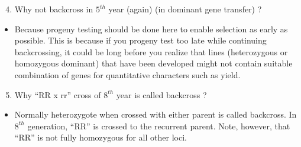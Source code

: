 \documentclass[11pt,ignorenonframetext,aspectratio=169]{beamer}
\newif\ifbibliography
\providecommand{\tightlist}{%
  \setlength{\itemsep}{0pt}\setlength{\parskip}{0pt}}
\begin{document}
\begin{frame}{}
\protect\hypertarget{section-20}{}
\begin{enumerate}
\setcounter{enumi}{3}
\tightlist
\item
  Why not backcross in \(5^{th}\) year (again) (in dominant gene
  transfer) ?
\end{enumerate}

\begin{itemize}
\tightlist
\item
  Because progeny testing should be done here to enable selection as
  early as possible. This is because if you progeny test too late while
  continuing backcrossing, it could be long before you realize that
  lines (heterozygous or homozygous dominant) that have been developed
  might not contain suitable combination of genes for quantitative
  characters such as yield.
\end{itemize}

\begin{enumerate}
\setcounter{enumi}{4}
\tightlist
\item
  Why ``RR x rr'' cross of \(8^{th}\) year is called backcross ?
\end{enumerate}

\begin{itemize}
\tightlist
\item
  Normally heterozygote when crossed with either parent is called
  backcross. In \(8^{th}\) generation, ``RR'' is crossed to the
  recurrent parent. Note, however, that ``RR'' is not fully homozygous
  for all other loci.
\end{itemize}
\end{frame}

          \begin{frame}[allowframebreaks]{}
    \bibliographytrue
    
    \end{frame}
  
\end{document}
